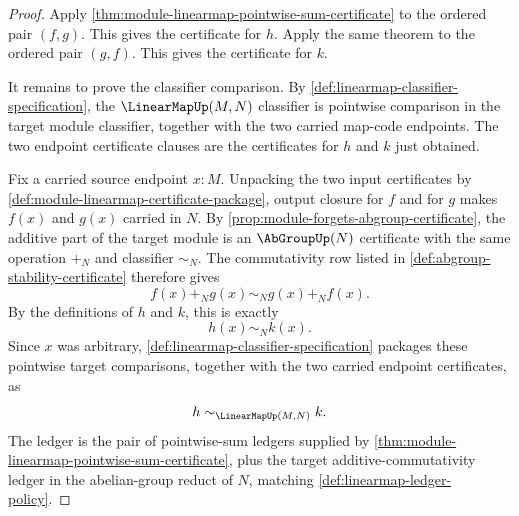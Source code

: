\begin{proof}
Apply \autoref{thm:module-linearmap-pointwise-sum-certificate} to the ordered pair $(f,g)$. This gives the certificate for $h$. Apply the same theorem to the ordered pair $(g,f)$. This gives the certificate for $k$.

It remains to prove the classifier comparison. By \autoref{def:linearmap-classifier-specification}, the $\LinearMapUp(M,N)$ classifier is pointwise comparison in the target module classifier, together with the two carried map-code endpoints. The two endpoint certificate clauses are the certificates for $h$ and $k$ just obtained.

Fix a carried source endpoint $x:M$. Unpacking the two input certificates by \autoref{def:module-linearmap-certificate-package}, output closure for $f$ and for $g$ makes $f(x)$ and $g(x)$ carried in $N$. By \autoref{prop:module-forgets-abgroup-certificate}, the additive part of the target module is an $\AbGroupUp(N)$ certificate with the same operation $+_N$ and classifier $\sim_N$. The commutativity row listed in \autoref{def:abgroup-stability-certificate} therefore gives
$$
f(x)+_N g(x)\sim_N g(x)+_N f(x).
$$
By the definitions of $h$ and $k$, this is exactly
$$
h(x)\sim_Nk(x).
$$
Since $x$ was arbitrary, \autoref{def:linearmap-classifier-specification} packages these pointwise target comparisons, together with the two carried endpoint certificates, as
$$
h\sim_{\LinearMapUp(M,N)}k.
$$
The ledger is the pair of pointwise-sum ledgers supplied by \autoref{thm:module-linearmap-pointwise-sum-certificate}, plus the target additive-commutativity ledger in the abelian-group reduct of $N$, matching \autoref{def:linearmap-ledger-policy}.
\end{proof}

